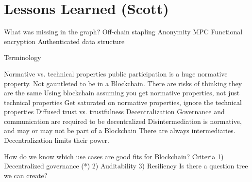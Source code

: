 
\section{Lessons Learned (Scott)}

What was missing in the graph?
	Off-chain stapling
	Anonymity
		MPC
		Functional encryption
	Authenticated data structure

Terminology

Normative vs. technical properties
	public participation is a huge normative property. Not gauntleted to be in a Blockchain.
	There are risks of thinking they are the same
		Using blockchain assuming you get normative properties, not just technical properties
		Get saturated on normative properties, ignore the technical properties
	Diffused trust vs. trustfulness
	Decentralization
		Governance and communication are required to be decentralized
		Disintermediation is normative, and may or may not be part of a Blockchain
			There are always intermediaries. Decentralization limits their power.



How do we know which use cases are good fits for Blockchain?
Criteria
	1) Decentralized governance (*)
	2) Auditability
	3) Resiliency	
Is there a question tree we can create?